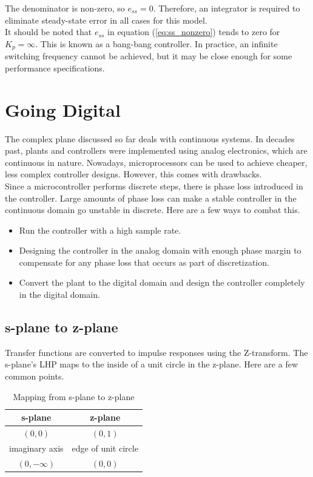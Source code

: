 \documentclass[10pt,conference,compsoc]{IEEEtran}
\begin{document}
\noindent The denominator is non-zero, so $e_{ss} = 0$. Therefore, an integrator
is required to eliminate \gls{steady-state error} in all cases for this model.
\\

\noindent It should be noted that $e_{ss}$ in equation (\ref{eq:ss_nonzero})
tends to zero for $K_p = \infty$. This is known as a bang-bang controller. In
practice, an infinite switching frequency cannot be achieved, but it may be
close enough for some performance specifications.

\section{Going Digital}

\noindent The complex plane discussed so far deals with continuous
\glspl{system}. In decades past, \glspl{plant} and controllers were implemented
using analog electronics, which are continuous in nature. Nowadays,
microprocessors can be used to achieve cheaper, less complex controller designs.
However, this comes with drawbacks. \\

\noindent Since a microcontroller performs discrete steps, there is phase loss
introduced in the controller. Large amounts of phase loss can make a stable
controller in the continuous domain go unstable in discrete. Here are a few ways
to combat this.

\begin{itemize}
  \item Run the controller with a high sample rate.
  \item Designing the controller in the analog domain with enough phase margin to compensate for any phase loss that occurs as part of discretization.
  \item Convert the \gls{plant} to the digital domain and design the controller
    completely in the digital domain.
\end{itemize}

\subsection{s-plane to z-plane}

\noindent Transfer functions are converted to impulse responses using the
Z-transform. The s-plane's LHP maps to the inside of a unit circle in the
z-plane. Here are a few common points.

\begin{table}[ht]
  \caption{Mapping from s-plane to z-plane}
  \renewcommand{\arraystretch}{1.3}
  \centering
  \begin{tabular}{|cc|}
    \hline
    \textbf{s-plane} & \textbf{z-plane} \\
    \hline
    $(0, 0)$ & $(0, 1)$ \\
    imaginary axis & edge of unit circle \\
    $(0, -\infty)$ & $(0, 0)$ \\
    \hline
  \end{tabular}
  \label{tab:s-plane2z-plane}
\end{table}
\end{document}
